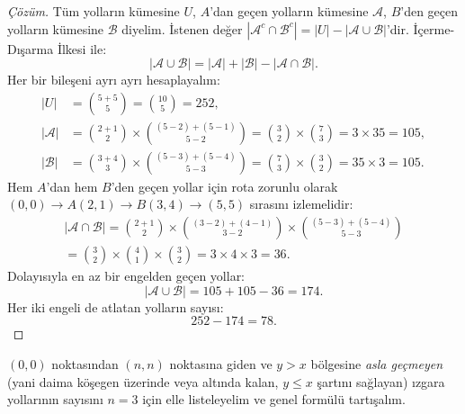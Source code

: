 \begin{proof}[Çözüm]
Tüm yolların kümesine $U$, $A$'dan geçen yolların kümesine $\mathcal{A}$, $B$'den geçen yolların kümesine $\mathcal{B}$ diyelim. İstenen değer $|\mathcal{A}^c \cap \mathcal{B}^c| = |U| - |\mathcal{A} \cup \mathcal{B}|$'dir.
İçerme-Dışarma İlkesi ile:
\[
|\mathcal{A} \cup \mathcal{B}| = |\mathcal{A}| + |\mathcal{B}| - |\mathcal{A} \cap \mathcal{B}|.
\]
Her bir bileşeni ayrı ayrı hesaplayalım:
\begin{align*}
|U| &= \binom{5+5}{5} = \binom{10}{5} = 252, \\
|\mathcal{A}| &= \binom{2+1}{2} \times \binom{(5-2)+(5-1)}{5-2} = \binom{3}{2} \times \binom{7}{3} = 3 \times 35 = 105, \\
|\mathcal{B}| &= \binom{3+4}{3} \times \binom{(5-3)+(5-4)}{5-3} = \binom{7}{3} \times \binom{3}{2} = 35 \times 3 = 105.
\end{align*}
Hem $A$'dan hem $B$'den geçen yollar için rota zorunlu olarak $(0,0) \to A(2,1) \to B(3,4) \to (5,5)$ sırasını izlemelidir:
\begin{multline*}
|\mathcal{A} \cap \mathcal{B}|
= \binom{2+1}{2} \times \binom{(3-2)+(4-1)}{3-2} \times \binom{(5-3)+(5-4)}{5-3} \\
= \binom{3}{2} \times \binom{4}{1} \times \binom{3}{2} = 3 \times 4 \times 3 = 36.
\end{multline*}
Dolayısıyla en az bir engelden geçen yollar:
\[
|\mathcal{A} \cup \mathcal{B}| = 105 + 105 - 36 = 174.
\]
Her iki engeli de atlatan yolların sayısı:
\[
252 - 174 = 78.
\]
\end{proof}

\begin{example}
$(0,0)$ noktasından $(n,n)$ noktasına giden ve $y > x$ bölgesine \emph{asla geçmeyen} (yani daima köşegen üzerinde veya altında kalan, $y \le x$ şartını sağlayan) ızgara yollarının sayısını $n=3$ için elle listeleyelim ve genel formülü tartışalım.
\end{example}

